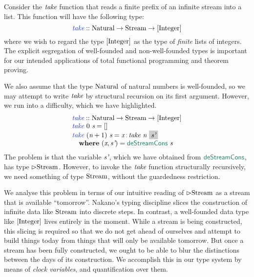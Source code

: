 Consider the $\textit{take}$ function that reads a finite prefix of an
infinite stream into a list. This function will have the following type:
\begin{displaymath}
  \defn{take} :: \tyname{Natural} \to \tyname{Stream} \to [\tyname{Integer}]
\end{displaymath}
where we wish to regard the type $[\textrm{Integer}]$ as the type of
\emph{finite} lists of integers. The explicit segregation of
well-founded and non-well-founded types is important for our intended
applications of total functional programming and theorem proving.

We also assume that the type $\textrm{Natural}$ of natural numbers is
well-founded, so we may attempt to write $\textit{take}$ by structural
recursion on its first argument. However, we run into a difficulty,
which we have \colorbox{greybg}{highlighted}.
\begin{displaymath}
  \begin{array}{l}
    \defn{take} :: \tyname{Natural} \to \tyname{Stream} \to [\tyname{Integer}] \\
    \defn{take}\ 0\ \ident{s} = [] \\
    \defn{take}\ (\ident{n}+1)\ \ident{s} = \ident{x} \mathop{\cons{:}} \ident{take}\ \ident{n}\ \colorbox{greybg}{$\ident{s'}$} \\
    \quad \kw{where}\ (\ident{x}, \ident{s'}) = \elim{deStreamCons}\ \ident{s}
  \end{array}
\end{displaymath}
The problem is that the variable $\textit{s'}$, which we have obtained
from $\elim{deStreamCons}$, has type $\rhd\textrm{Stream}$. However,
to invoke the $\textit{take}$ function structurally recursively, we
need something of type $\textrm{Stream}$, without the guardedness
restriction.

We analyse this problem in terms of our intuitive reading of
$\rhd\textrm{Stream}$ as a stream that is available
``tomorrow''. Nakano's typing discipline slices the construction of
infinite data like $\textrm{Stream}$ into discrete steps. In contrast,
a well-founded data type like $[\textrm{Integer}]$ lives entirely in
the moment. While a stream is being constructed, this slicing is
required so that we do not get ahead of ourselves and attempt to build
things today from things that will only be available tomorrow. But
once a stream has been fully constructed, we ought to be able to blur
the distinctions between the days of its construction. We accomplish
this in our type system by means of \emph{clock variables}, and
quantification over them.


